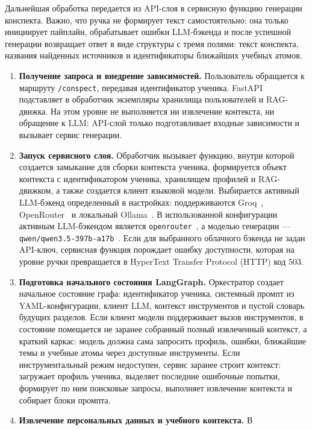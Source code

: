 \documentclass[a4paper,12pt]{extarticle}
\begin{document}
Дальнейшая обработка передается из API-слоя в сервисную функцию генерации
конспекта. Важно, что ручка не формирует текст самостоятельно: она только
инициирует пайплайн, обрабатывает ошибки LLM-бэкенда и после успешной генерации
возвращает ответ в виде структуры с тремя полями: текст конспекта, названия
найденных источников и идентификаторы ближайших учебных атомов.

\begin{enumerate}
    \item \textbf{Получение запроса и внедрение зависимостей.} Пользователь обращается
	к маршруту \texttt{/conspect}, передавая идентификатор ученика. FastAPI~\cite{fastapi2026} подставляет
	в обработчик экземпляры хранилища пользователей и RAG-движка. На этом уровне
	не выполняется ни извлечение контекста, ни обращение к LLM: API-слой только подготавливает
	входные зависимости и вызывает сервис генерации.
    \item \textbf{Запуск сервисного слоя.} Обработчик вызывает функцию,
	внутри которой создается замыкание для
	сборки контекста ученика, формируется объект контекста с
	идентификатором ученика, хранилищем профилей и RAG-движком, а также создается
	клиент языковой модели. Выбирается активный LLM-бэкенд определенный в настройках: 
	поддерживаются Groq~\cite{groq2026}, OpenRouter~\cite{openrouter2026} и 
	локальный Ollama~\cite{ollama2026}. В использованной
	конфигурации активным LLM-бэкендом является \texttt{openrouter}~\cite{openrouter2026}, 
	а моделью генерации ---
	\texttt{qwen/qwen3.5-397b-a17b}~\cite{qwen35-397b-a17b}.
	Если для выбранного облачного бэкенда не задан API-ключ, сервисная функция
	порождает ошибку доступности, которая на уровне ручки превращается в HyperText Transfer Protocol (HTTP) код 503.
    \item \textbf{Подготовка начального состояния LangGraph.} Оркестратор
	создает начальное состояние графа:
	идентификатор ученика, системный промпт из YAML-конфигурации, клиент LLM,
	контекст инструментов и пустой словарь будущих разделов. Если клиент модели
	поддерживает вызов инструментов, в состояние помещается не заранее собранный
	полный извлеченный контекст, а краткий каркас: модель должна сама запросить
	профиль, ошибки, ближайшие темы и учебные атомы через доступные инструменты.
	Если инструментальный режим недоступен, сервис заранее строит контекст:
	загружает профиль ученика, выделяет последние ошибочные попытки, формирует
	по ним поисковые запросы, выполняет извлечение контекста и собирает блоки промпта.
    \item \textbf{Извлечение персональных данных и учебного контекста.} В

\end{enumerate}
\end{document}
